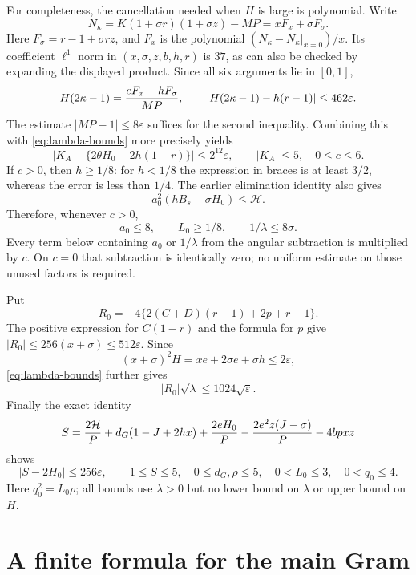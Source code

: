 \documentclass[11pt]{article}
\newcommand{\eps}{\varepsilon}
\begin{document}
For completeness, the cancellation needed when $H$ is large is
polynomial. Write
\[
 N_\kappa=K(1+\sigma r)(1+\sigma z)-MP=xF_x+\sigma F_\sigma.
\]
Here $F_\sigma=r-1+\sigma rz$, and $F_x$ is the polynomial
$(N_\kappa-N_\kappa|_{x=0})/x$. Its coefficient $\ell^1$ norm
in $(x,\sigma,z,b,h,r)$ is $37$, as can also be checked by
expanding the displayed product. Since all six arguments lie in
$[0,1]$,
\[
 H(2\kappa-1)={eF_x+hF_\sigma\over MP},\qquad
 |H(2\kappa-1)-h(r-1)|\le462\eps.
\]
The estimate $|MP-1|\le8\eps$ suffices for the second inequality.
Combining this with \eqref{eq:lambda-bounds} more precisely yields
\begin{equation}\label{eq:KA-bounds}
 |K_A-\{2\theta H_0-2h(1-r)\}|\le2^{12}\eps,
 \qquad |K_A|\le5,\quad 0\le c\le6.
\end{equation}
If $c>0$, then $h\ge1/8$: for $h<1/8$ the expression in braces
is at least $3/2$, whereas the error is less than $1/4$.
The earlier elimination identity also gives
\[
 a_0^2(hB_s-\sigma H_0)\le\mathcal H.
\]
Therefore, whenever $c>0$,
\begin{equation}\label{eq:c-positive}
 a_0\le8,\qquad L_0\ge1/8,\qquad
 1/\lambda\le8\sigma.
\end{equation}
Every term below containing $a_0$ or $1/\lambda$ from the angular
subtraction is multiplied by $c$. On $c=0$ that subtraction is
identically zero; no uniform estimate on those unused factors is
required.

Put
\[
 R_0=-4\{2(C+D)(r-1)+2p+r-1\}.
\]
The positive expression for $C(1-r)$ and the formula for $p$ give
$|R_0|\le256(x+\sigma)\le512\eps$. Since
\[
 (x+\sigma)^2H=xe+2\sigma e+\sigma h\le2\eps,
\]
\eqref{eq:lambda-bounds} further gives
\begin{equation}\label{eq:R0-bounds}
 |R_0|\sqrt\lambda\le1024\sqrt\eps.
\end{equation}
Finally the exact identity
\[
 S={2\mathcal H\over P}+d_G(1-J+2hx)
       +{2eH_0\over P}-{2e^2z(J-\sigma)\over P}-4bpxz
\]
shows
\begin{equation}\label{eq:S-bounds}
 |S-2H_0|\le256\eps,\qquad
 1\le S\le5,\quad 0\le d_G,\rho\le5,
 \quad 0<L_0\le3,\quad 0<q_0\le4.
\end{equation}
Here $q_0^2=L_0\rho$; all bounds use $\lambda>0$ but no lower
bound on $\lambda$ or upper bound on $H$.

\section{A finite formula for the main Gram}
\end{document}
